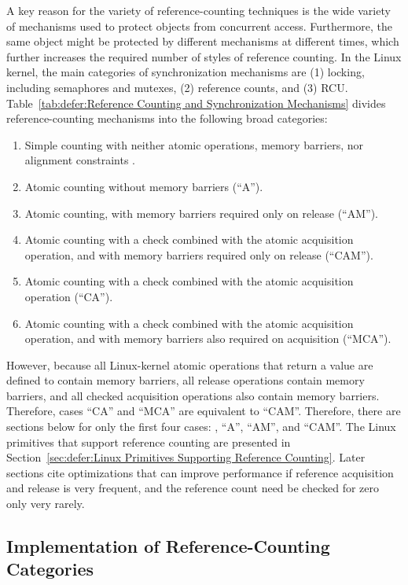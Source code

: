 A key reason for the variety of reference-counting techniques is the
wide variety of mechanisms used to protect objects from concurrent
access.
Furthermore, the same object might be protected by different mechanisms
at different times, which further increases the required number
of styles of reference counting.
In the Linux kernel, the main categories of synchronization
mechanisms are (1) locking,
including semaphores and mutexes, (2) reference counts, and (3) RCU.
Table~\ref{tab:defer:Reference Counting and Synchronization Mechanisms}
divides reference-counting mechanisms into the following broad categories:
\begin{enumerate}
\item	Simple counting with neither atomic operations, memory
	barriers, nor alignment constraints .
\item	Atomic counting without memory barriers (``A'').
\item	Atomic counting, with memory barriers required only on release
	(``AM'').
\item	Atomic counting with a check combined with the atomic acquisition
	operation, and with memory barriers required only on release
	(``CAM'').
\item	Atomic counting with a check combined with the atomic acquisition
	operation (``CA'').
\item	Atomic counting with a check combined with the atomic acquisition
	operation, and with memory barriers also required on acquisition
	(``MCA'').
\end{enumerate}
However, because all Linux-kernel atomic operations that return a
value are defined to contain memory barriers, all release operations
contain memory barriers, and all checked acquisition operations also
contain memory barriers.
Therefore, cases ``CA'' and ``MCA'' are equivalent to ``CAM''.
Therefore, there are sections below for only the first four cases:
, ``A'', ``AM'', and ``CAM''.
The Linux primitives that support reference counting are presented in
Section~\ref{sec:defer:Linux Primitives Supporting Reference Counting}.
Later sections cite optimizations that can improve performance
if reference acquisition and release is very frequent, and the
reference count need be checked for zero only very rarely.

\subsection{Implementation of Reference-Counting Categories}
\label{sec:defer:Implementation of Reference-Counting Categories}

